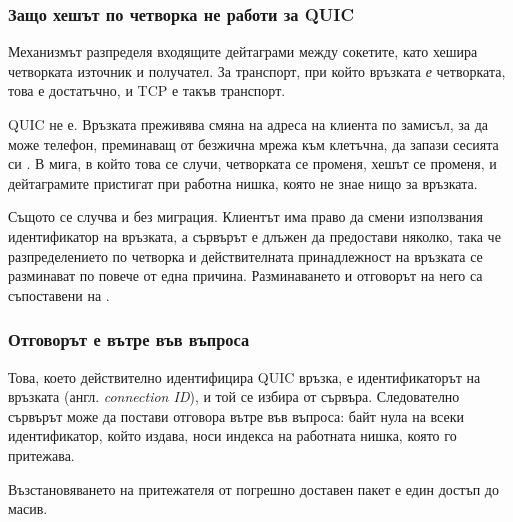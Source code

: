 \subsubsection{Защо хешът по четворка не работи за QUIC}

Механизмът  разпределя входящите дейтаграми между сокетите, като
хешира четворката източник и получател. За транспорт, при който връзката \emph{е}
четворката, това е достатъчно, и TCP е такъв транспорт.

QUIC не е. Връзката преживява смяна на адреса на клиента по замисъл, за да може телефон,
преминаващ от безжична мрежа към клетъчна, да запази сесията си \cite{rfc9000}. В мига, в
който това се случи, четворката се променя, хешът се променя, и дейтаграмите пристигат
при работна нишка, която не знае нищо за връзката.

Същото се случва и без миграция. Клиентът има право да смени използвания идентификатор на
връзката, а сървърът е длъжен да предостави няколко, така че разпределението по четворка
и действителната принадлежност на връзката се разминават по повече от една причина. Разминаването и отговорът на него са съпоставени на .



\subsubsection{Отговорът е вътре във въпроса}

Това, което действително идентифицира QUIC връзка, е идентификаторът на връзката (англ.
\emph{connection ID}), и той се избира от сървъра. Следователно сървърът може да постави
отговора вътре във въпроса: байт нула на всеки идентификатор, който издава, носи индекса
на работната нишка, която го притежава.

Възстановяването на притежателя от погрешно доставен пакет е един достъп до масив.

